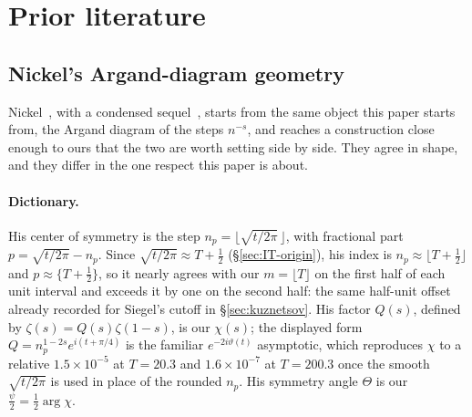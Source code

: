 \documentclass[11pt]{article}
\theoremstyle{definition}
\begin{document}
\clearpage

\section{Prior literature}\label{sec:prior-lit}

\subsection{Nickel's Argand-diagram geometry}\label{sec:nickel}

Nickel~\cite{Nickel2013}, with a condensed sequel~\cite{Nickel2015}, starts
from the same object this paper starts from,
the Argand diagram of the steps $n^{-s}$, and reaches a construction close
enough to ours that the two are worth setting side by side. They agree in
shape, and they differ in the one respect this paper is about.

\paragraph{Dictionary.} His center of symmetry is the step
$n_p=\bigl\lfloor\sqrt{t/2\pi}\,\bigr\rfloor$, with fractional part $p=\sqrt{t/2\pi}-n_p$. Since
$\sqrt{t/2\pi}\approx T+\tfrac12$ (\S\ref{sec:IT-origin}), his index is
$n_p\approx\lfloor T+\tfrac12\rfloor$ and $p\approx\{T+\tfrac12\}$, so it
nearly agrees with our $m=\lfloor T\rfloor$ on the first half of each unit interval
and exceeds it by one on the second half: the same half-unit offset already
recorded for Siegel's cutoff in \S\ref{sec:kuznetsov}. His factor $Q(s)$,
defined by $\zeta(s)=Q(s)\zeta(1-s)$, is our $\chi(s)$; the displayed form
$Q=n_p^{1-2s}e^{i(t+\pi/4)}$ is the familiar $e^{-2i\vartheta(t)}$ asymptotic,
which reproduces $\chi$ to a relative $1.5\times10^{-5}$ at $T=20.3$ and
$1.6\times10^{-7}$ at $T=200.3$ once the smooth $\sqrt{t/2\pi}$ is used in
place of the rounded $n_p$. His symmetry angle $\Theta$ is our
$\tfrac{\psi}{2}=\tfrac12\arg\chi$.
\end{document}
